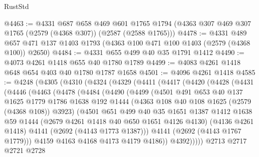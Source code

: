 \begin{lexlean}{RustStd}
\begin{coremodule}
{\begin{coremodule}
{{{{{{{{{{@4463 := @4331
    @687
    @658
    @469
    @601
    @1765
    @1794
    (@4363 @307 @469 @307 @1765 (@2579 (@4368 @307)) (@2587 (@2588 @1765)))
@4478 := @4331
    @489
    @657
    @471
    @137
    @1403
    @1793
    (@4363 @100 @471 @100 @1403 (@2579 (@4368 @100)) @2650)
@4484 := @4331 @655 @499 @40 @35 @1791 @1412
@4490 := @4073 @4261 @1418 @655 @40 @1780 @1789
@4499 := @4083 @4261 @1418 @648 @654 @403 @40 @1780 @1787 @1658
@4501 := @4096 @4261 @1418
@4585 := @4248
    (@4305
      (@4310
        (@4324
          (@4329
            (@4411
              (@4417
                (@4420
                  (@4428
                    (@4431
                      (@4446
                        (@4463
                          (@4478
                            (@4484
                              (@4490
                                (@4499
                                  (@4501
                                    @491
                                    @653
                                    @40
                                    @137
                                    @1625
                                    @1779
                                    @1786
                                    @1638
                                    @192
                                    @1444
                                    (@4363 @108 @40 @108 @1625 (@2579 (@4368 @108)) @3923)
                                    (@4501
                                      @651
                                      @499
                                      @40
                                      @35
                                      @1651
                                      @1387
                                      @1412
                                      @1638
                                      @59
                                      @1444
                                      (@2679 @4261 @1418 @40 @650 @1651 @4126 @4130)
                                      (@4136 @4261 @1418)
                                      @4141
                                      (@2692 (@4143 @1773 @1387)))
                                    @4141
                                    (@2692 (@4143 @1767 @1779)))
                                  @4159
                                  @4163
                                  @4168
                                  @4173
                                  @4179
                                  @4186))
                              @4392)))))
                    @2713
                    @2717
                    @2721
                    @2728
}}}}}}}}}}
\end{coremodule}}
\end{coremodule}
\end{lexlean}

